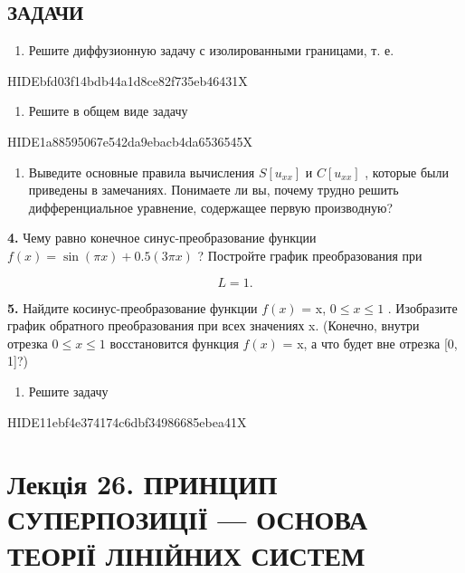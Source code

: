 \documentclass[
  ukrainian,
]{article}
\providecommand{\tightlist}{%
  \setlength{\itemsep}{0pt}\setlength{\parskip}{0pt}}
\begin{document}
\subsection{ЗАДАЧИ}\label{ux437ux430ux434ux430ux447ux438-1}

\begin{enumerate}
\def\labelenumi{\arabic{enumi}.}
\tightlist
\item
  Решите диффузионную задачу с изолированными границами, т. е.
\end{enumerate}

HIDEbfd03f14bdb44a1d8ce82f735eb46431X

\begin{enumerate}
\def\labelenumi{\arabic{enumi}.}
\setcounter{enumi}{1}
\tightlist
\item
  Решите в общем виде задачу
\end{enumerate}

HIDE1a88595067e542da9ebacb4da6536545X

\begin{enumerate}
\def\labelenumi{\arabic{enumi}.}
\setcounter{enumi}{2}
\tightlist
\item
  Выведите основные правила вычисления \(S[u_{xx}]\) и \(C[u_{xx}]\) ,
  которые были приведены в замечаниях. Понимаете ли вы, почему трудно
  решить дифференциальное уравнение, содержащее первую производную?
\end{enumerate}

\textbf{4.} Чему равно конечное синус-преобразование функции
\(f(x) = \sin{(\pi x)} + 0.5 (3\pi x)\) ? Постройте график
преобразования при

\[
L=1.
\]

\textbf{5.} Найдите косинус-преобразование функции \(f(x)\) = x,
\(0 \le x \le 1\) . Изобразите график обратного преобразования при всех
значениях x. (Конечно, внутри отрезка \(0 \le x \le 1\) восстановится
функция \(f(x)\) = x, а что будет вне отрезка {[}0, 1{]}?)

\begin{enumerate}
\def\labelenumi{\arabic{enumi}.}
\setcounter{enumi}{5}
\tightlist
\item
  Решите задачу
\end{enumerate}

HIDE11ebf4e374174c6dbf34986685ebea41X

\section{Лекція 26. ПРИНЦИП СУПЕРПОЗИЦІЇ --- ОСНОВА ТЕОРІЇ ЛІНІЙНИХ
СИСТЕМ}\label{ux43bux435ux43aux446ux456ux44f-26.-ux43fux440ux438ux43dux446ux438ux43f-ux441ux443ux43fux435ux440ux43fux43eux437ux438ux446ux456ux457-ux43eux441ux43dux43eux432ux430-ux442ux435ux43eux440ux456ux457-ux43bux456ux43dux456ux439ux43dux438ux445-ux441ux438ux441ux442ux435ux43c}
\end{document}
